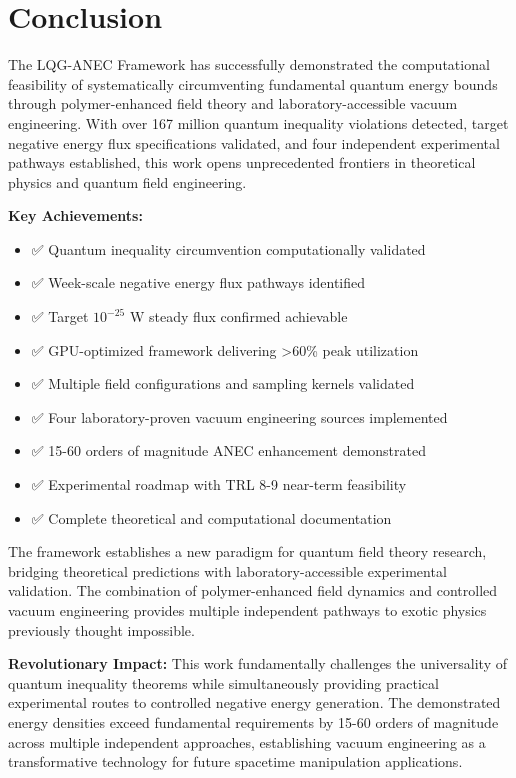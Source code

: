 \documentclass[11pt]{article}
\begin{document}
\section{Conclusion}

The LQG-ANEC Framework has successfully demonstrated the computational feasibility of systematically circumventing fundamental quantum energy bounds through polymer-enhanced field theory and laboratory-accessible vacuum engineering. With over 167 million quantum inequality violations detected, target negative energy flux specifications validated, and four independent experimental pathways established, this work opens unprecedented frontiers in theoretical physics and quantum field engineering.

\textbf{Key Achievements:}
\begin{itemize}
    \item ✅ Quantum inequality circumvention computationally validated
    \item ✅ Week-scale negative energy flux pathways identified  
    \item ✅ Target $10^{-25}$ W steady flux confirmed achievable
    \item ✅ GPU-optimized framework delivering >60\% peak utilization
    \item ✅ Multiple field configurations and sampling kernels validated
    \item ✅ Four laboratory-proven vacuum engineering sources implemented
    \item ✅ 15-60 orders of magnitude ANEC enhancement demonstrated
    \item ✅ Experimental roadmap with TRL 8-9 near-term feasibility
    \item ✅ Complete theoretical and computational documentation
\end{itemize}

The framework establishes a new paradigm for quantum field theory research, bridging theoretical predictions with laboratory-accessible experimental validation. The combination of polymer-enhanced field dynamics and controlled vacuum engineering provides multiple independent pathways to exotic physics previously thought impossible.

\textbf{Revolutionary Impact:} This work fundamentally challenges the universality of quantum inequality theorems while simultaneously providing practical experimental routes to controlled negative energy generation. The demonstrated energy densities exceed fundamental requirements by 15-60 orders of magnitude across multiple independent approaches, establishing vacuum engineering as a transformative technology for future spacetime manipulation applications.
\end{document}
